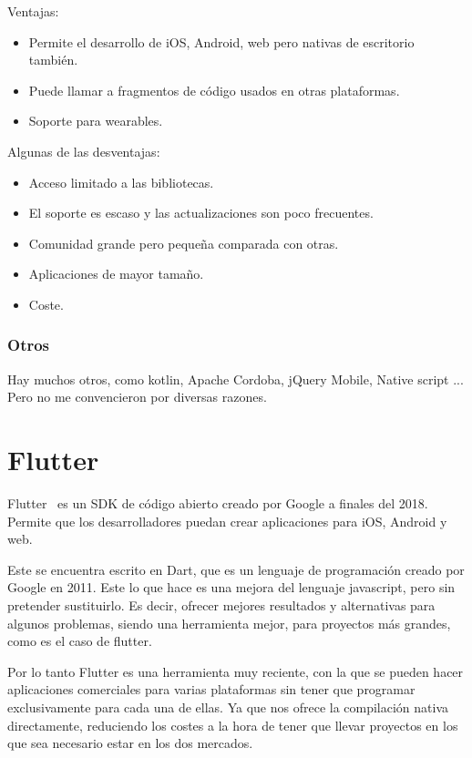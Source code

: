 Ventajas:
\begin{itemize}
	\item Permite el desarrollo de iOS, Android, web pero nativas de escritorio también.
	\item Puede llamar a fragmentos de código usados en otras plataformas.
	\item Soporte para wearables.
\end{itemize}

Algunas de las desventajas:
\begin{itemize}
	\item Acceso limitado a las bibliotecas.
	\item El soporte es escaso y las actualizaciones son poco frecuentes.
	\item Comunidad grande pero pequeña comparada con otras.
	\item Aplicaciones de mayor tamaño.
	\item Coste.
\end{itemize}

\subsubsection{Otros}
Hay muchos otros, como kotlin, Apache Cordoba, jQuery Mobile, Native script ...
Pero no me convencieron por diversas razones.
 
\section{Flutter}
Flutter~\cite{wiki:flutter} es un SDK de código abierto creado por Google a finales del 2018. Permite que los desarrolladores puedan crear aplicaciones para iOS, Android y web.

Este se encuentra escrito en Dart, que es un lenguaje de programación creado por Google en 2011. Este lo que hace es una mejora del lenguaje javascript, pero sin pretender sustituirlo. Es decir, ofrecer mejores resultados y alternativas para algunos problemas, siendo una herramienta mejor, para proyectos más grandes, como es el caso de flutter.

Por lo tanto Flutter es una herramienta muy reciente, con la que se pueden hacer aplicaciones comerciales para varias plataformas sin tener que programar exclusivamente para cada una de ellas. Ya que nos ofrece la compilación nativa directamente, reduciendo los costes a la hora de tener que llevar proyectos en los que sea necesario estar en los dos mercados.

